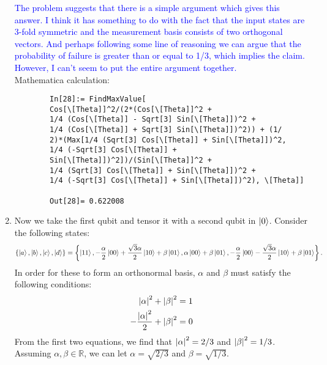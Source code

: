 \documentclass{article}
\theoremstyle{definition}
\newcommand{\al}{\alpha}
\newcommand{\be}{\beta}
\newcommand{\f}[2]{\frac{#1}{#2}}
\newcommand{\lc}{\left\{}
\newcommand{\rc}{\right\}}
\begin{document}
\begin{enumerate}[label=(\alph*)]
	\textcolor{blue}{The problem suggests that there is a simple argument which gives this answer. I think it has something to do with the fact that the input states are 3-fold symmetric and the measurement basis consists of two orthogonal vectors. And perhaps following some line of reasoning we can argue that the probability of failure is greater than or equal to 1/3, which implies the claim. However, I can't seem to put the entire argument together. }\\
	
	
	Mathematica calculation:
	\begin{lstlisting}
		In[28]:= FindMaxValue[
		Cos[\[Theta]]^2/(2*(Cos[\[Theta]]^2 + 
		1/4 (Cos[\[Theta]] - Sqrt[3] Sin[\[Theta]])^2 + 
		1/4 (Cos[\[Theta]] + Sqrt[3] Sin[\[Theta]])^2)) + (1/
		2)*(Max[1/4 (Sqrt[3] Cos[\[Theta]] + Sin[\[Theta]])^2, 
		1/4 (-Sqrt[3] Cos[\[Theta]] + 
		Sin[\[Theta]])^2])/(Sin[\[Theta]]^2 + 
		1/4 (Sqrt[3] Cos[\[Theta]] + Sin[\[Theta]])^2 + 
		1/4 (-Sqrt[3] Cos[\[Theta]] + Sin[\[Theta]])^2), \[Theta]]
		
		Out[28]= 0.622008
	\end{lstlisting}
	


	
	\item Now we take the first qubit and tensor it with a second qubit in $\ket{0}$. Consider the following states:
	\begin{align*}
		\{ \ket{a}, \ket{b}, \ket{c}, \ket{d}  \} = \lc \ket{11}, -\f{\al}{2}\ket{00}+\f{\sqrt{3}\al}{2}\ket{10} + \be\ket{01}, \al\ket{00} + \be\ket{01}, -\f{\al}{2}\ket{00} - \f{\sqrt{3}\al}{2}\ket{10} + \be\ket{01} \rc.
	\end{align*}
	In order for these to form an orthonormal basis, $\al$ and $\be$ must satisfy the following conditions:
	\begin{align*}
		\abs{\al}^2 + \abs{\be}^2 &= 1\\
		-\f{\abs{\al}^2}{2} + \abs{\be}^2 &= 0 
	\end{align*}
	From the first two equations, we find that $\abs{\al}^2 = 2/3$ and $\abs{\be}^2 = 1/3$. Assuming $\al,\be\in \mathbb{R}$, we can let $\al = \sqrt{2/3}$ and $\be = \sqrt{1/3}$. 
	

\end{enumerate}
\end{document}
